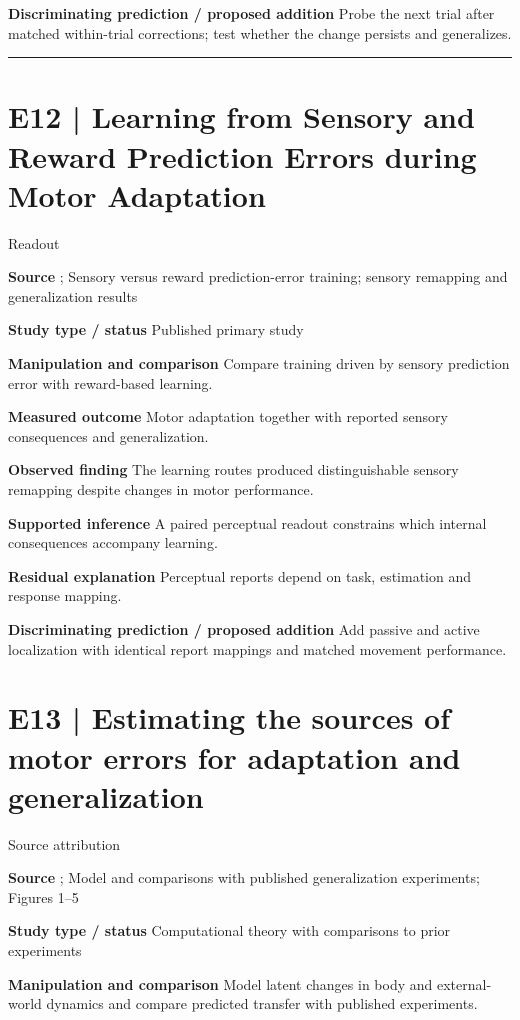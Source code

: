 \documentclass[11pt,a4paper]{article}
\begin{document}
\textbf{Discriminating prediction / proposed addition} Probe the next trial after matched within-trial corrections; test whether the change persists and generalizes.\par
\bigskip\hrule\medskip\section{E12 | Learning from Sensory and Reward Prediction Errors during Motor Adaptation}
{\small\sffamily\color{navy} Readout}\par
\textbf{Source} \cite{izawa2011}; Sensory versus reward prediction-error training; sensory remapping and generalization results\par
\textbf{Study type / status} Published primary study\par
\textbf{Manipulation and comparison} Compare training driven by sensory prediction error with reward-based learning.\par
\textbf{Measured outcome} Motor adaptation together with reported sensory consequences and generalization.\par
\textbf{Observed finding} The learning routes produced distinguishable sensory remapping despite changes in motor performance.\par
\textbf{Supported inference} A paired perceptual readout constrains which internal consequences accompany learning.\par
\textbf{Residual explanation} Perceptual reports depend on task, estimation and response mapping.\par
\textbf{Discriminating prediction / proposed addition} Add passive and active localization with identical report mappings and matched movement performance.\par
\clearpage\section{E13 | Estimating the sources of motor errors for adaptation and generalization}
{\small\sffamily\color{navy} Source attribution}\par
\textbf{Source} \cite{berniker2008}; Model and comparisons with published generalization experiments; Figures 1--5\par
\textbf{Study type / status} Computational theory with comparisons to prior experiments\par
\textbf{Manipulation and comparison} Model latent changes in body and external-world dynamics and compare predicted transfer with published experiments.\par
\end{document}
